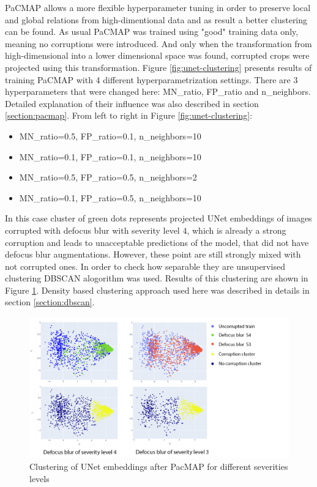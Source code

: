 PaCMAP allows a more flexible hyperparameter tuning in order to preserve local and global relations from high-dimentional data and as result a better clustering can be found. As usual PaCMAP was trained using "good" training data only, meaning no corruptions were introduced. And only when the transformation from high-dimensional into a lower dimensional space was found, corrupted crops were projected using this transformation. Figure \ref{fig:unet-clustering} presents results of training PaCMAP with 4 different hyperparametrization settings. There are 3 hyperparameters that were changed here: MN\_ratio, FP\_ratio and n\_neighbors. Detailed explanation of their influence was also described in section \ref{section:pacmap}. From left to right in Figure \ref{fig:unet-clustering}:

\begin{itemize}
	\item MN\_ratio=0.5, FP\_ratio=0.1, n\_neighbors=10
	\item MN\_ratio=0.1, FP\_ratio=0.1, n\_neighbors=10
	\item MN\_ratio=0.5, FP\_ratio=0.5, n\_neighbors=2
	\item MN\_ratio=0.1, FP\_ratio=0.5, n\_neighbors=10
\end{itemize}

In this case cluster of green dots represents projected UNet embeddings of images corrupted with defocus blur with severity level $4$, which is already a strong corruption and leads to unacceptable predictions of the model, that did not have defocus blur augmentations. However, these point are still strongly mixed with not corrupted ones. In order to check how separable they are unsupervised clustering DBSCAN alogorithm was used. Results of this clustering are shown in Figure \ref{fig:unet-clustering-sev-levels}. Density based clustering approach used here was described in details in section \ref{section:dbscan}. 

\begin{figure}[htb]
	\begin{center}
		\includegraphics[width=0.6\linewidth]{bilder/unet-embeddings/db-levels.png}
		\caption{Clustering of UNet embeddings after PacMAP for different severities levels}
		\label{fig:unet-clustering-sev-levels}
	\end{center}
\end{figure}

